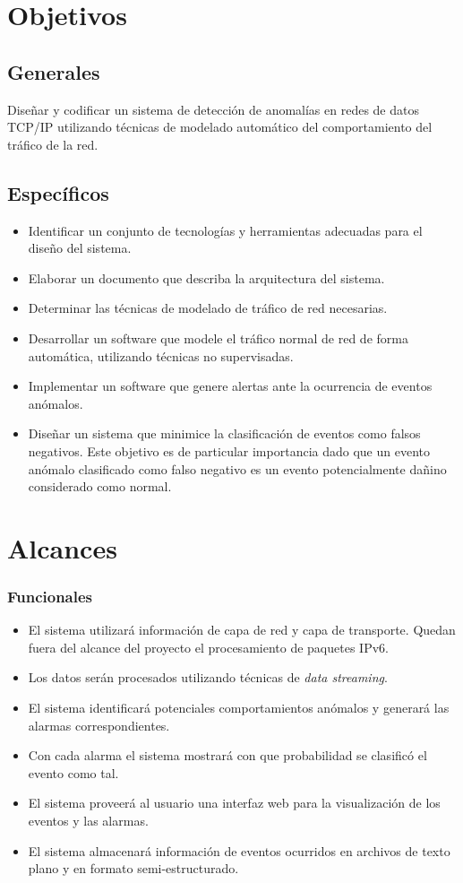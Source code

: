\section*{Objetivos}
\subsection*{Generales}
Diseñar y codificar un sistema de detección de anomalías en redes de datos TCP/IP utilizando técnicas de modelado automático del comportamiento del tráfico de la red.
\subsection*{Específicos}
\begin{itemize}

\item Identificar un conjunto de tecnologías y herramientas adecuadas para el diseño del sistema.
\item Elaborar un documento que describa la arquitectura del sistema.
\item Determinar las técnicas de modelado de tráfico de red necesarias.
\item Desarrollar un software que modele el tráfico normal de red de forma automática, utilizando técnicas no supervisadas.
\item Implementar un software que genere alertas ante la ocurrencia de eventos anómalos.
\item Diseñar un sistema que minimice la clasificación de eventos como falsos negativos. Este objetivo es de particular importancia dado que un evento anómalo clasificado como falso negativo es un evento potencialmente dañino considerado como normal.
\end{itemize}

\section*{Alcances}

\subsubsection*{Funcionales}
\begin{itemize}
	\item El sistema utilizará información de capa de red\cite{rfc791} y capa de transporte\cite{rfc793}\cite{rfc1180}. Quedan fuera del alcance del proyecto el procesamiento de paquetes IPv6.
	\item Los datos serán procesados utilizando técnicas de \textit{data streaming}\cite{Fischer:2012:RVA:2245276.2245432}.
	\item El sistema identificará potenciales comportamientos anómalos y generará las alarmas correspondientes.
	\item Con cada alarma el sistema mostrará con que probabilidad se clasificó el evento como tal.
	\item El sistema proveerá al usuario una interfaz web para la visualización de los eventos y las alarmas.
	\item El sistema almacenará información de eventos ocurridos en archivos de texto plano y en formato semi-estructurado.
\end{itemize}

